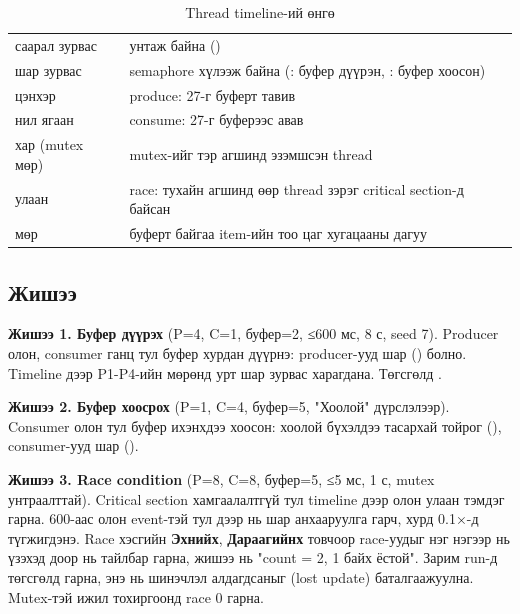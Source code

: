 \documentclass[12pt,a4paper]{article}
\begin{document}
\begin{table}[H]\centering\small
\caption{Thread timeline-ий өнгө}\label{tab:legend}
\begin{tabular}{|L{0.3\textwidth}|L{0.7\textwidth}|}\hline
{} &  \\\hline
саарал зурвас & унтаж байна () \\\hline
шар зурвас & semaphore хүлээж байна (: буфер дүүрэн, : буфер хоосон) \\\hline
цэнхэр  & produce: 27-г буферт тавив \\\hline
нил ягаан  & consume: 27-г буферээс авав \\\hline
хар  (mutex мөр) & mutex-ийг тэр агшинд эзэмшсэн thread \\\hline
улаан & race: тухайн агшинд өөр thread зэрэг critical section-д байсан \\\hline
{} мөр & буферт байгаа item-ийн тоо цаг хугацааны дагуу \\\hline
\end{tabular}
\end{table}

\subsection{Жишээ}
\textbf{Жишээ 1. Буфер дүүрэх} (P=4, C=1, буфер=2, ≤600 мс, 8 с, seed 7). Producer олон, consumer ганц тул буфер хурдан дүүрнэ: producer-ууд шар () болно. Timeline дээр P1-P4-ийн мөрөнд урт шар зурвас харагдана. Төгсгөлд .


\textbf{Жишээ 2. Буфер хоосрох} (P=1, C=4, буфер=5, "Хоолой" дүрслэлээр). Consumer олон тул буфер ихэнхдээ хоосон: хоолой бүхэлдээ тасархай тойрог (), consumer-ууд шар ().


\textbf{Жишээ 3. Race condition} (P=8, C=8, буфер=5, ≤5 мс, 1 с, mutex унтраалттай). Critical section хамгаалалтгүй тул timeline дээр олон улаан тэмдэг гарна. 600-аас олон event-тэй тул дээр нь шар анхааруулга гарч, хурд 0.1×-д түгжигдэнэ. Race хэсгийн \textbf{Эхнийх}, \textbf{Дараагийнх} товчоор race-уудыг нэг нэгээр нь үзэхэд доор нь тайлбар гарна, жишээ нь "count = 2, 1 байх ёстой". Зарим run-д төгсгөлд  гарна, энэ нь шинэчлэл алдагдсаныг (lost update) баталгаажуулна. Mutex-тэй ижил тохиргоонд race 0 гарна.
\end{document}
